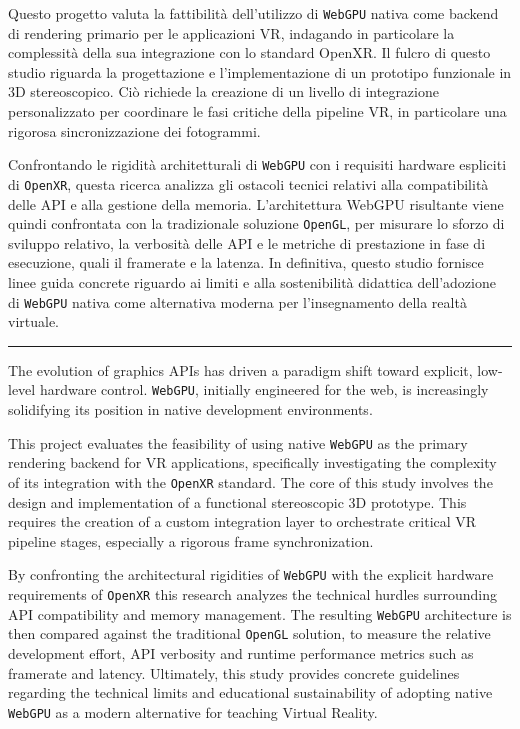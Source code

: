 \documentclass[a4paper, 11pt, twoside]{report}
\begin{document}
Questo progetto valuta la fattibilità dell’utilizzo di \texttt{WebGPU} nativa come backend di rendering primario per le
applicazioni VR, indagando in particolare la complessità della sua integrazione con lo standard OpenXR.
Il fulcro di questo studio riguarda la progettazione e l’implementazione di un prototipo funzionale in 3D stereoscopico.
Ciò richiede la creazione di un livello di integrazione personalizzato per coordinare le fasi critiche della pipeline VR,
in particolare una rigorosa sincronizzazione dei fotogrammi.

Confrontando le rigidità architetturali di \texttt{WebGPU} con i requisiti hardware espliciti di \texttt{OpenXR},
questa ricerca analizza gli ostacoli tecnici relativi alla compatibilità delle API e alla gestione della memoria.
L’architettura WebGPU risultante viene quindi confrontata con la tradizionale soluzione \texttt{OpenGL}, per misurare lo
sforzo di sviluppo relativo, la verbosità delle API e le metriche di prestazione in fase di esecuzione, quali il
\gls{framerate} e la latenza.
In definitiva, questo studio fornisce linee guida concrete riguardo ai limiti e alla sostenibilità didattica
dell’adozione di \texttt{WebGPU} nativa come alternativa moderna per l’insegnamento della realtà virtuale.

\vspace{0.25cm}
\noindent\rule{\textwidth}{0.5pt}
\vspace{0.25cm}

\noindent The evolution of graphics APIs has driven a paradigm shift toward explicit, low-level hardware control.
\texttt{WebGPU}, initially engineered for the web, is increasingly solidifying its position in native development
environments.

This project evaluates the feasibility of using native \texttt{WebGPU} as the primary rendering backend for VR
applications, specifically investigating the complexity of its integration with the \texttt{\gls{OpenXR}} standard.
The core of this study involves the design and implementation of a functional stereoscopic 3D prototype.
This requires the creation of a custom integration layer to orchestrate critical VR pipeline stages, especially a
rigorous frame synchronization.

By confronting the architectural rigidities of \texttt{WebGPU} with the explicit hardware requirements of \texttt{OpenXR}
this research analyzes the technical hurdles surrounding API compatibility and memory management.
The resulting \texttt{WebGPU} architecture is then compared against the traditional \texttt{OpenGL} solution, to measure
the relative development effort, API verbosity and runtime performance metrics such as \gls{framerate} and latency.
Ultimately, this study provides concrete guidelines regarding the technical limits and educational sustainability of
adopting native \texttt{WebGPU} as a modern alternative for teaching Virtual Reality.
\end{document}
